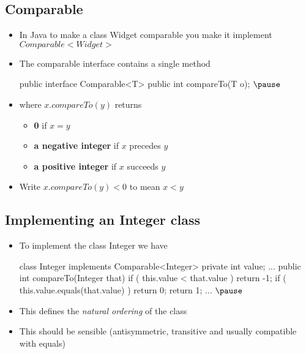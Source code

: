 


\begin{slide}
\section[-1]{Comparable}

\begin{PauseHighLight}
  \begin{itemize}
  \item In Java to make a class Widget comparable you make it implement
    \jl$Comparable<Widget>$\pause
  \item The comparable interface contains a single method
    \begin{java}
      public interface Comparable<T>
      {
         public int compareTo(T o);
      }$\pause$
    \end{java}
  \item where \jl$x.compareTo(y)$ returns
    \begin{itemize}
    \item \textbf{0} if $x=y$
    \item \textbf{a negative integer} if $x$ precedes $y$
    \item \textbf{a positive integer} if $x$ succeeds $y$\pause
    \end{itemize}
  \item Write \jl$x.compareTo(y)<0$ to mean $x<y$\pause
  \end{itemize}
\end{PauseHighLight}

\end{slide}


\begin{slide}
\section[-2]{Implementing an Integer class}
\begin{PauseHighLight}
  \begin{itemize}
  \item To implement the class Integer we have
    \begin{java}
      class Integer implements Comparable<Integer>
      {
         private int value;
         ...
         public int compareTo(Integer that){
           if ( this.value < that.value )
              return -1;
           if ( this.value.equals(that.value) )
              return 0;
           return 1;
         }
         ... 
      }$\pause$
    \end{java}
  \item This defines the \emph{natural ordering} of the class\pause
 \item This should be sensible (antisymmetric, transitive and usually
    compatible with equals)\pause
  \end{itemize}
\end{PauseHighLight}

\end{slide}

